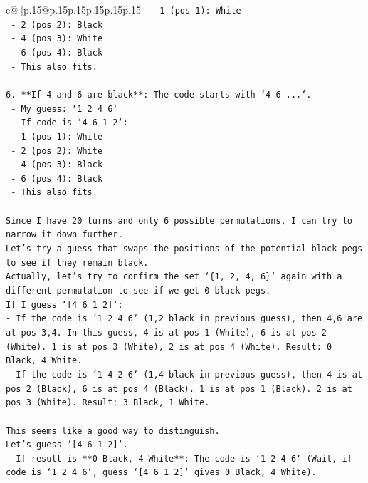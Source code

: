 \documentclass{article}
\begin{document}
{\begin{supertabular}{c@{$\;$}|p{.15\linewidth}@{}p{.15\linewidth}p{.15\linewidth}p{.15\linewidth}p{.15\linewidth}p{.15\linewidth}}
{{{\texttt{        {-} 1 (pos 1): White} \\
\texttt{        {-} 2 (pos 2): Black} \\
\texttt{        {-} 4 (pos 3): White} \\
\texttt{        {-} 6 (pos 4): Black} \\
\texttt{    {-} This also fits.} \\
\\ 
\texttt{6.  **If 4 and 6 are black**: The code starts with `4 6 ...`.} \\
\texttt{    {-} My guess: `1 2 4 6`} \\
\texttt{    {-} If code is `4 6 1 2`:} \\
\texttt{        {-} 1 (pos 1): White} \\
\texttt{        {-} 2 (pos 2): White} \\
\texttt{        {-} 4 (pos 3): Black} \\
\texttt{        {-} 6 (pos 4): Black} \\
\texttt{    {-} This also fits.} \\
\\ 
\texttt{Since I have 20 turns and only 6 possible permutations, I can try to narrow it down further.} \\
\texttt{Let's try a guess that swaps the positions of the potential black pegs to see if they remain black.} \\
\texttt{Actually, let's try to confirm the set `\{1, 2, 4, 6\}` again with a different permutation to see if we get 0 black pegs.} \\
\texttt{If I guess `{[}4 6 1 2{]}`:} \\
\texttt{{-} If the code is `1 2 4 6` (1,2 black in previous guess), then 4,6 are at pos 3,4. In this guess, 4 is at pos 1 (White), 6 is at pos 2 (White). 1 is at pos 3 (White), 2 is at pos 4 (White). Result: 0 Black, 4 White.} \\
\texttt{{-} If the code is `1 4 2 6` (1,4 black in previous guess), then 4 is at pos 2 (Black), 6 is at pos 4 (Black). 1 is at pos 1 (Black). 2 is at pos 3 (White). Result: 3 Black, 1 White.} \\
\\ 
\texttt{This seems like a good way to distinguish.} \\
\texttt{Let's guess `{[}4 6 1 2{]}`.} \\
\texttt{{-} If result is **0 Black, 4 White**: The code is `1 2 4 6` (Wait, if code is `1 2 4 6`, guess `{[}4 6 1 2{]}` gives 0 Black, 4 White).} \\
}}}
\end{supertabular}}
\end{document}
